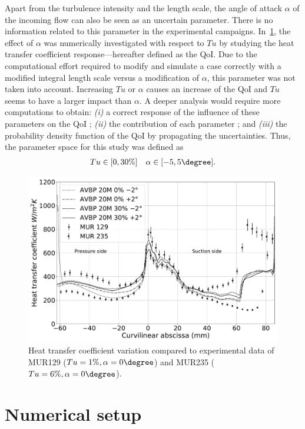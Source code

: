 Apart from the turbulence intensity and the length scale, the angle of attack $\alpha$ of the incoming flow can also be seen as an uncertain parameter. There is no information related to this parameter in the experimental campaigns. In~\cref{fig:space-tu-alpha}, the effect of $\alpha$ was numerically investigated with respect to $Tu$ by studying the heat transfer coefficient response---hereafter defined as the QoI. Due to the computational effort required to modify and simulate a case correctly with a modified integral length scale versus a modification of $\alpha$, this parameter was not taken into account. Increasing $Tu$ or $\alpha$ causes an increase of the QoI and $Tu$ seems to have a larger impact than $\alpha$. A deeper analysis would require more computations to obtain: \textit{(i)} a correct response of the influence of these parameters on the QoI ; \textit{(ii)} the contribution of each parameter ; and \textit{(iii)} the probability density function of the QoI by propagating the uncertainties. Thus, the parameter space for this study was defined as
\begin{align}
Tu \in [0, 30\%] \quad \alpha \in [-5,5\degree].
\end{align}

\begin{figure}[!h]
\centering
\includegraphics[width=0.9\linewidth,keepaspectratio]{fig/applications/ls89/11_2column_color-online-only_space_tu-alpha.pdf}
\caption{Heat transfer coefficient variation compared to experimental data of MUR129 ($Tu=1\%, \alpha = 0\degree$) and MUR235 ($Tu=6\%, \alpha = 0\degree$).}
\label{fig:space-tu-alpha}
\end{figure}

\section{Numerical setup}\label{sec:ls89_num}

